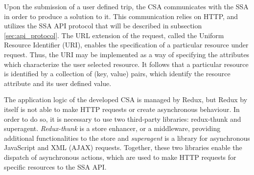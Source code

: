 Upon the submission of a user defined trip, the CSA communicates with the SSA in order to produce a solution to it. This communication relies on HTTP, and utilizes the SSA API protocol that will be described in subsection \ref{sec:api_protocol}. The URL extension of the request, called the Uniform Resource Identifier (URI), enables the specification of a particular resource under request. Thus, the URI may be implemented as a way of specifying the attributes which characterize the user selected resource. It follows that a particular resource is identified by a collection of (key, value) pairs, which identify the resource attribute and its user defined value.

The application logic of the developed CSA is managed by Redux, but Redux by itself is not able to make HTTP requests or create asynchronous behaviour. In order to do so, it is necessary to use two third-party  libraries: redux-thunk and superagent. \textit{Redux-thunk} is a store enhancer, or a middleware, providing additional functionalities to the store and \textit{superagent} is a library for asynchronous JavaScript and XML (AJAX) requests. Together, these two libraries enable the dispatch of asynchronous actions, which are used to make HTTP requests for specific resources to the SSA API.




